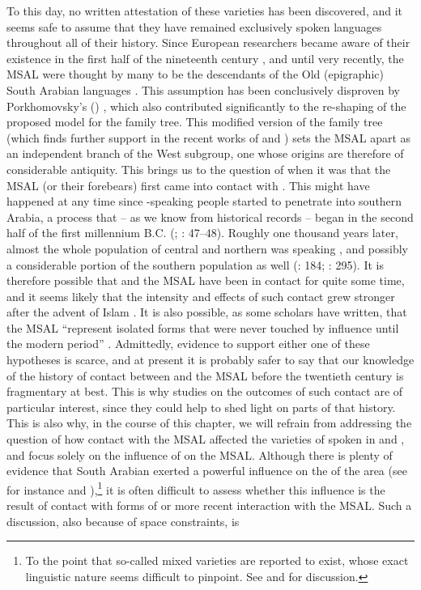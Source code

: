 \documentclass[output=paper]{langsci/langscibook}
\begin{document}
To this day, no written attestation of these varieties has been discovered, and it seems safe to assume that they have remained exclusively spoken languages throughout all of their history. Since European researchers became aware of their existence in the first half of the nineteenth century \citep{Wellsted1837}, and until very recently, the MSAL were thought by many to be the descendants of the Old (epigraphic) South Arabian languages \citep[16]{Rubin2014}. This assumption has been conclusively disproven by Porkhomovsky’s (\citeyear{Porkhomovsky1997}) , which also contributed significantly to the re-shaping of the proposed model for the  family tree. This modified version of the family tree (which finds further support in the recent works of \citealt{Kogan2015} and \citealt{Edzard2017}) sets the MSAL apart as an independent branch of the West  subgroup, one whose origins are therefore of considerable antiquity. This brings us to the question of when it was that the MSAL (or their forebears) first came into contact with . This might have happened at any time since -speaking people started to penetrate into southern Arabia, a process that – as we know from historical records – began in the second half of the first millennium B.C. (\citealt{Robin1991}; \citealt{Hoyland2001}: 47--48). Roughly one thousand years later, almost the whole population of central and northern  was speaking , and possibly a considerable portion of the southern population as well (\citealt{Beeston1981}: 184; \citealt{Zammit2011}: 295). It is therefore possible that  and the MSAL have been in contact for quite some time, and it seems likely that the intensity and effects of such contact grew stronger after the advent of Islam \citep[247]{Lonnet2011}. It is also possible, as some scholars have written, that the MSAL “represent isolated forms that were never touched by  influence until the modern period” \citep[127]{Versteegh2014book}. Admittedly, evidence to support either one of these hypotheses is scarce, and at present it is probably safer to say that our knowledge of the history of contact between  and the MSAL before the twentieth century is fragmentary at best. This is why studies on the outcomes of such contact are of particular interest, since they could help to shed light on parts of that history. This is also why, in the course of this chapter, we will refrain from addressing the question of how contact with the MSAL affected the varieties of  spoken in  and , and focus solely on the influence of  on the MSAL. Although there is plenty of evidence that South Arabian exerted a powerful influence on the  of the area (see for instance \citealt{Retsö2000} and \citealt{Watson2018}),\footnote{To the point that so-called mixed varieties are reported to exist, whose exact linguistic nature seems difficult to pinpoint. See \citet{WatsonEtAl2006} and \citet{Watson2011SAYemeni} for discussion.} it is often difficult to assess whether this influence is the result of contact with forms of  or more recent interaction with the MSAL. Such a discussion, also because of space constraints, is 
\end{document}
